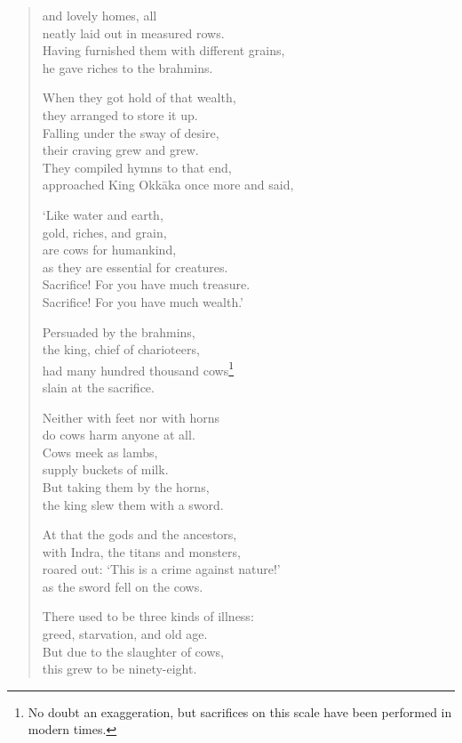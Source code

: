 \documentclass[12pt,openany]{book}%
\begin{document}
\begin{verse}
and lovely homes, all \\
neatly laid out in measured rows. \\
Having furnished them with different grains, \\
he gave riches to the brahmins. 

When they got hold of that wealth, \\
they arranged to store it up. \\
Falling under the sway of desire, \\
their craving grew and grew. \\
They compiled hymns to that end, \\
approached King \textsanskrit{Okkāka} once more and said, 

‘Like water and earth, \\
gold, riches, and grain, \\
are cows for humankind, \\
as they are essential for creatures. \\
Sacrifice! For you have much treasure. \\
Sacrifice! For you have much wealth.’ 

Persuaded by the brahmins, \\
the king, chief of charioteers, \\
had many hundred thousand cows\footnote{No doubt an exaggeration, but sacrifices on this scale have been performed in modern times. } \\
slain at the sacrifice. 

Neither with feet nor with horns \\
do cows harm anyone at all. \\
Cows meek as lambs, \\
supply buckets of milk. \\
But taking them by the horns, \\
the king slew them with a sword. 

At that the gods and the ancestors, \\
with Indra, the titans and monsters, \\
roared out: ‘This is a crime against nature!’ \\
as the sword fell on the cows. 

There used to be three kinds of illness: \\
greed, starvation, and old age. \\
But due to the slaughter of cows, \\
this grew to be ninety-eight. 


\end{verse}
\end{document}
